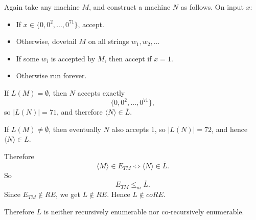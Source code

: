 \documentclass[11pt]{article}
\begin{document}
Again take any machine $M$, and construct a machine $N$ as follows. On input $x$:
\begin{itemize}
    \item If $x \in \{0,0^2,\dots,0^{71}\}$, accept.
    \item Otherwise, dovetail $M$ on all strings $w_1,w_2,\dots$
    \item If some $w_i$ is accepted by $M$, then accept if $x=1$.
    \item Otherwise run forever.
\end{itemize}

If $L(M)=\emptyset$, then $N$ accepts exactly
\[
\{0,0^2,\dots,0^{71}\},
\]
so $|L(N)|=71$, and therefore $\langle N\rangle \in \overline{L}$.

If $L(M)\neq \emptyset$, then eventually $N$ also accepts $1$, so $|L(N)|=72$, and hence $\langle N\rangle \in L$.

Therefore
\[
\langle M \rangle \in E_{TM} \iff \langle N \rangle \in \overline{L}.
\]
So
\[
E_{TM} \leq_m \overline{L}.
\]
Since $E_{TM}\notin RE$, we get $\overline{L}\notin RE$. Hence $L\notin coRE$.

Therefore $L$ is neither recursively enumerable nor co-recursively enumerable.
\end{document}
